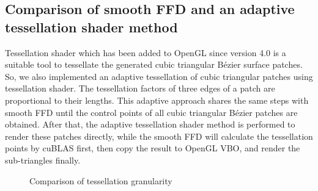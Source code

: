 \documentclass[3p]{elsarticle}
\begin{document}
\subsection{Comparison of smooth FFD and an adaptive tessellation shader method}

Tessellation shader which has been added to OpenGL since version 4.0 is a suitable tool to tessellate the generated
cubic triangular B\'ezier surface patches. So, we also implemented an adaptive tessellation of cubic triangular patches
using tessellation shader. The tessellation factors of three edges of a patch are proportional to their lengths. This
adaptive approach shares the same steps with smooth FFD until the control points of all cubic triangular B\'ezier
patches are obtained. After that, the adaptive tessellation shader method is performed to render these patches directly,
while the smooth FFD will calculate the tessellation points by cuBLAS first, then copy the result to OpenGL VBO, and
render the sub-triangles finally.

\begin{figure}
	\centering
		\centering
		\caption{Comparison of tessellation granularity}
		\label{fig:granularity}
\end{figure}
\end{document}
